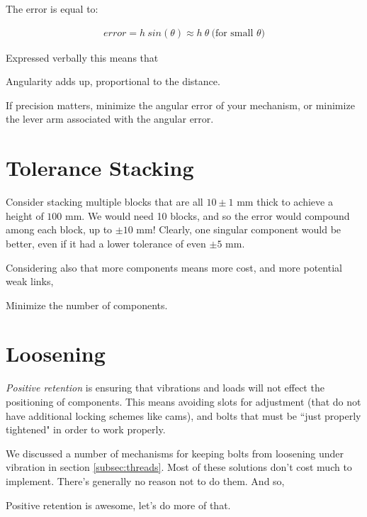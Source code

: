The error is equal to:

\begin{align}
	error = h \ sin(\theta) \approx h \ \theta \ \mbox{(for small $\theta$)}
\end{align}

Expressed verbally this means that

\begin{theorem} \label{theorem:abbe}
Angularity adds up, proportional to the distance.
\end{theorem}

If precision matters, minimize the angular error of your mechanism, or minimize the lever arm associated with the angular error.


\section{Tolerance Stacking}

Consider stacking multiple blocks that are all $10 \pm 1$ mm thick to achieve a height of $100$ mm. We would need 10 blocks, and so the error would compound among each block, up to $\pm 10$ mm! Clearly, one singular component would be better, even if it had a lower tolerance of even $\pm 5$ mm.

Considering also that more components means more cost, and more potential weak links,

\begin{theorem}
Minimize the number of components.
\end{theorem}

\section{Loosening}

\textit{Positive retention} is ensuring that vibrations and loads will not effect the positioning of components. This means avoiding slots for adjustment (that do not have additional locking schemes like cams), and bolts that must be ``just properly tightened" in order to work properly.

We discussed a number of mechanisms for keeping bolts from loosening under vibration in section \ref{subsec:threads}. Most of these solutions don't cost much to implement. There's generally no reason not to do them. And so,

\begin{theorem}
Positive retention is awesome, let's do more of that.
\end{theorem}

